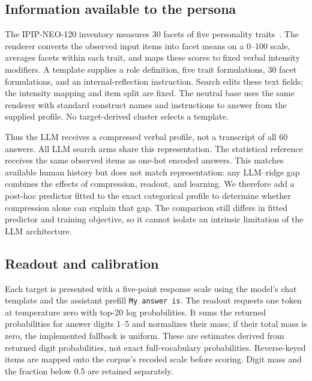\documentclass[10pt,twocolumn]{article}
\begin{document}
\subsection{Information available to the persona}
The IPIP-NEO-120 inventory measures 30 facets of five personality
traits~\cite{johnson2014ipip}. The renderer converts the observed input items
into facet means on a 0--100 scale, averages facets within each trait, and
maps these scores to fixed verbal intensity modifiers. A template supplies
a role definition, five trait formulations, 30 facet formulations, and an
internal-reflection instruction. Search edits these text fields; the
intensity mapping and item split are fixed. The neutral base uses the same
renderer with standard construct names and instructions to answer from the
supplied profile. No target-derived cluster selects a template.

Thus the LLM receives a compressed verbal profile, not a transcript of all
60 answers. All LLM search arms share this representation. The statistical
reference receives the same observed items as one-hot encoded answers.
This matches available human history but does not match representation:
any LLM--ridge gap combines the effects of compression, readout, and learning.
We therefore add a post-hoc predictor fitted to the exact categorical profile
to determine whether compression alone can explain that gap. The comparison
still differs in fitted predictor and training objective, so it cannot isolate
an intrinsic limitation of the LLM architecture.

\subsection{Readout and calibration}\label{sec:calibration}
Each target is presented with a five-point response scale using the model's
chat template and the assistant prefill \texttt{My answer is}. The readout
requests one token at temperature zero with top-20 log probabilities. It sums
the returned probabilities for answer digits 1--5 and normalizes their mass;
if their total mass is zero, the implemented fallback is uniform. These are
estimates derived from returned digit probabilities, not exact full-vocabulary
probabilities. Reverse-keyed items are mapped onto the corpus's recoded scale
before scoring. Digit mass and the fraction below 0.5 are retained separately.
\end{document}
